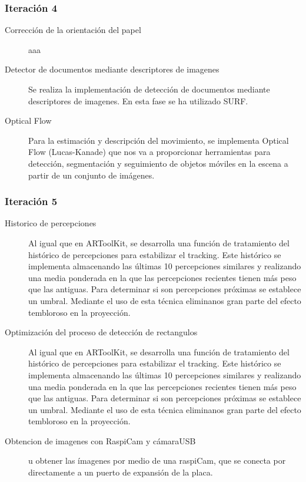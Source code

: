 \subsubsection{Iteración 4}

\begin{description}
\item [Corrección de la orientación del papel] aaa
\item [Detector de documentos mediante descriptores de imagenes] Se realiza la implementación de detección de documentos mediante descriptores de imagenes. En esta fase se ha utilizado SURF.
\item [Optical Flow] Para la estimación y descripción del movimiento, se implementa Optical Flow  (Lucas-Kanade) que nos va a proporcionar herramientas para detección, segmentación y seguimiento de  objetos móviles en la escena a partir de un conjunto de imágenes. 
\end{description}

\subsubsection{Iteración 5}
\begin{description}
\item [Historico de percepciones] Al igual que en ARToolKit, se desarrolla una función de tratamiento del histórico de percepciones para estabilizar el tracking. Este histórico se implementa  almacenando las últimas 10 percepciones similares y realizando una media ponderada en la que las percepciones recientes tienen más peso que las antiguas. Para determinar si son percepciones próximas se establece un umbral. Mediante el uso de esta técnica eliminanos gran parte del efecto tembloroso en la proyección.
\item [Optimización del proceso de detección de rectangulos] Al igual que en ARToolKit, se desarrolla una función de tratamiento del histórico de percepciones para estabilizar el tracking. Este histórico se implementa  almacenando las últimas 10 percepciones similares y realizando una media ponderada en la que las percepciones recientes tienen más peso que las antiguas. Para determinar si son percepciones próximas se establece un umbral. Mediante el uso de esta técnica eliminanos gran parte del efecto tembloroso en la proyección.
\item [Obtencion de imagenes con RaspiCam y cámaraUSB] u obtener las ímagenes por medio de una raspiCam, que se conecta por directamente a un puerto de expansión de la placa.
\end{description}


